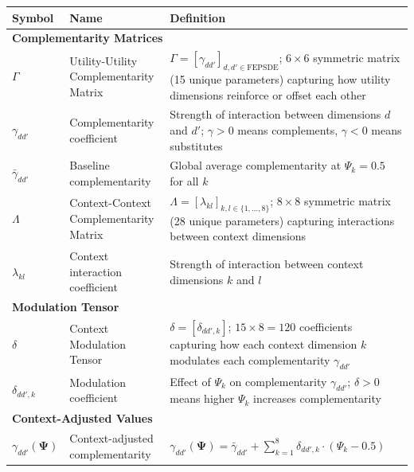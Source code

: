 \begin{center}
\renewcommand{\arraystretch}{1.3}
\begin{longtable}{@{}lp{3cm}p{8cm}@{}}
\toprule
\textbf{Symbol} & \textbf{Name} & \textbf{Definition} \\
\midrule
\endhead

\multicolumn{3}{l}{\textbf{Complementarity Matrices}} \\
\midrule
$\Gamma$ & Utility-Utility Complementarity Matrix & $\Gamma = [\gamma_{dd'}]_{d,d' \in \text{FEPSDE}}$; $6 \times 6$ symmetric matrix (15 unique parameters) capturing how utility dimensions reinforce or offset each other \\
$\gamma_{dd'}$ & Complementarity coefficient & Strength of interaction between dimensions $d$ and $d'$; $\gamma > 0$ means complements, $\gamma < 0$ means substitutes \\
$\bar{\gamma}_{dd'}$ & Baseline complementarity & Global average complementarity at $\Psi_k = 0.5$ for all $k$ \\
\midrule
$\Lambda$ & Context-Context Complementarity Matrix & $\Lambda = [\lambda_{kl}]_{k,l \in \{1,\ldots,8\}}$; $8 \times 8$ symmetric matrix (28 unique parameters) capturing interactions between context dimensions \\
$\lambda_{kl}$ & Context interaction coefficient & Strength of interaction between context dimensions $k$ and $l$ \\
\midrule

\multicolumn{3}{l}{\textbf{Modulation Tensor}} \\
\midrule
$\delta$ & Context Modulation Tensor & $\delta = [\delta_{dd',k}]$; $15 \times 8 = 120$ coefficients capturing how each context dimension $k$ modulates each complementarity $\gamma_{dd'}$ \\
$\delta_{dd',k}$ & Modulation coefficient & Effect of $\Psi_k$ on complementarity $\gamma_{dd'}$; $\delta > 0$ means higher $\Psi_k$ increases complementarity \\
\midrule

\multicolumn{3}{l}{\textbf{Context-Adjusted Values}} \\
\midrule
$\gamma_{dd'}(\boldsymbol{\Psi})$ & Context-adjusted complementarity & $\gamma_{dd'}(\boldsymbol{\Psi}) = \bar{\gamma}_{dd'} + \sum_{k=1}^{8} \delta_{dd',k} \cdot (\Psi_k - 0.5)$ \\
\midrule


\end{longtable}
\end{center}

